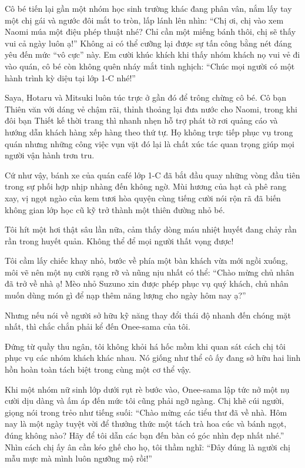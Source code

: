 \documentclass[../main.tex]{subfiles}
\begin{document}
Cô bé tiến lại gần một nhóm học sinh trường khác đang phân vân, nắm lấy tay một chị gái và ngước đôi mắt to tròn, lấp lánh lên nhìn: ``Chị ơi, chị vào xem Naomi múa một điệu phép thuật nhé? Chỉ cần một miếng bánh thôi, chị sẽ thấy vui cả ngày luôn ạ!'' Không ai có thể cưỡng lại được sự tấn công bằng nét đáng yêu đến mức ``vô cực'' này. Em cười khúc khích khi thấy nhóm khách nọ vui vẻ đi vào quán, cô bé còn không quên nháy mắt tinh nghịch: ``Chúc mọi người có một hành trình kỳ diệu tại lớp 1-C nhé!''

Saya, Hotaru và Mitsuki luôn túc trực ở gần đó để trông chừng cô bé. Cô bạn Thiên văn với dáng vẻ chậm rãi, thỉnh thoảng lại đưa nước cho Naomi, trong khi đôi bạn Thiết kế thời trang thì nhanh nhẹn hỗ trợ phát tờ rơi quảng cáo và hướng dẫn khách hàng xếp hàng theo thứ tự. Họ không trực tiếp phục vụ trong quán nhưng những công việc vụn vặt đó lại là chất xúc tác quan trọng giúp mọi người vận hành trơn tru.

Cứ như vậy, bánh xe của quán café lớp 1-C đã bắt đầu quay những vòng đầu tiên trong sự phối hợp nhịp nhàng đến không ngờ. Mùi hương của hạt cà phê rang xay, vị ngọt ngào của kem tươi hòa quyện cùng tiếng cười nói rộn rã đã biến không gian lớp học cũ kỹ trở thành một thiên đường nhỏ bé.

Tôi hít một hơi thật sâu lần nữa, cảm thấy dòng máu nhiệt huyết đang chảy rần rần trong huyết quản. Không thể để mọi người thất vọng được!

Tôi cầm lấy chiếc khay nhỏ, bước về phía một bàn khách vừa mới ngồi xuống, môi vẽ nên một nụ cười rạng rỡ và nũng nịu nhất có thể: ``Chào mừng chủ nhân đã trở về nhà ạ! Mèo nhỏ Suzuno xin được phép phục vụ quý khách, chủ nhân muốn dùng món gì để nạp thêm năng lượng cho ngày hôm nay ạ?''

Nhưng nếu nói về người sở hữu kỹ năng thay đổi thái độ nhanh đến chóng mặt nhất, thì chắc chắn phải kể đến Onee-sama của tôi.

Đứng từ quầy thu ngân, tôi không khỏi há hốc mồm khi quan sát cách chị tôi phục vụ các nhóm khách khác nhau. Nó giống như thể cô ấy đang sở hữu hai linh hồn hoàn toàn tách biệt trong cùng một cơ thể vậy.

Khi một nhóm nữ sinh lớp dưới rụt rè bước vào, Onee-sama lập tức nở một nụ cười dịu dàng và ấm áp đến mức tôi cũng phải ngỡ ngàng. Chị khẽ cúi người, giọng nói trong trẻo như tiếng suối: ``Chào mừng các tiểu thư đã về nhà. Hôm nay là một ngày tuyệt vời để thưởng thức một tách trà hoa cúc và bánh ngọt, đúng không nào? Hãy để tôi dẫn các bạn đến bàn có góc nhìn đẹp nhất nhé.'' Nhìn cách chị ấy ân cần kéo ghế cho họ, tôi thầm nghĩ: ``Đây đúng là người chị mẫu mực mà mình luôn ngưỡng mộ rồi!''
\end{document}
